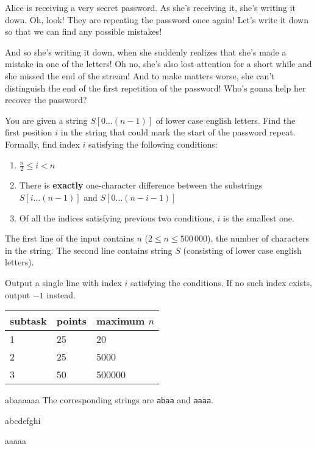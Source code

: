 





Alice is receiving a very secret password. As she's receiving it, she's writing
it down. Oh, look! They are repeating the password once again! Let's write it down
so that we can find any possible mistakes!

And so she's writing it down, when she suddenly realizes that she's made a mistake
in one of the letters! Oh no, she's also lost attention for a short while and she
missed the end of the stream! And to make matters worse, she can't distinguish the
end of the first repetition of the password! Who's gonna help her recover the password?


You are given a string $S[0 \ldots (n-1)]$ of lower case english letters. Find the first position $i$ in the
string that could mark the start of the password repeat. Formally, find index $i$ satisfying the following conditions:

\begin{enumerate}
    \item $\frac{n}{2} \leq i < n$
    \item There is \textbf{exactly} one-character difference between the
    substrings $S[i\ldots (n-1)]$ and $S[0\ldots (n - i - 1)]$
    \item Of all the indices satisfying previous two conditions, $i$ is the
    smallest one.
\end{enumerate}


The first line of the input contains $n$ ($2 \leq n \leq 500\,000$), the number of characters in the string.
The second line contains string $S$ (consisting of lower case english letters).


Output a single line with index $i$ satisfying the conditions. If no such index
exists, output $-1$ instead.


\centering
\begin{tabular}{|l|l|l|}
\hline
subtask & points & maximum $n$  \\ \hline
1       & 25     & 20           \\ \hline
2       & 25     & 5000         \\ \hline
3       & 50     & 500000       \\ \hline
\end{tabular}




abaaaaaa
\sampleCOMMENT
The corresponding strings are \texttt{abaa} and \texttt{aaaa}.
\sampleEND


\bigskip


abcdefghi
\sampleEND

\bigskip

aaaaa
\sampleEND


